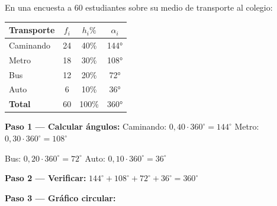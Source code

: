 \documentclass[11pt, letterpaper]{article}
\begin{document}
\begin{tcolorbox}[examplebox, title={Ej. 6. Gráfico circular y polígono de frecuencias}]
En una encuesta a 60 estudiantes sobre su medio de transporte al colegio:

\begin{center}
\renewcommand{\arraystretch}{1.3}
\begin{tabular}{l c c c}
\toprule
\textbf{Transporte} & $f_i$ & $h_i\%$ & $\alpha_i$\\
\midrule
Caminando & 24 & 40\% & 144°\\
Metro      & 18 & 30\% & 108°\\
Bus        & 12 & 20\% & 72°\\
Auto       & 6  & 10\% & 36°\\
\midrule
\textbf{Total} & 60 & 100\% & 360°\\
\bottomrule
\end{tabular}
\end{center}

\textbf{Paso 1 --- Calcular ángulos:} \quad Caminando: $0{,}40 \cdot 360^\circ = 144^\circ$ \quad Metro: $0{,}30 \cdot 360^\circ = 108^\circ$

  Bus: $0{,}20 \cdot 360^\circ = 72^\circ$ \quad Auto: $0{,}10 \cdot 360^\circ = 36^\circ$
\medskip

\textbf{Paso 2 --- Verificar:} $144^\circ + 108^\circ + 72^\circ + 36^\circ = 360^\circ$ \checkmark
\medskip

\textbf{Paso 3 --- Gráfico circular:}



\end{tcolorbox}
\end{document}
